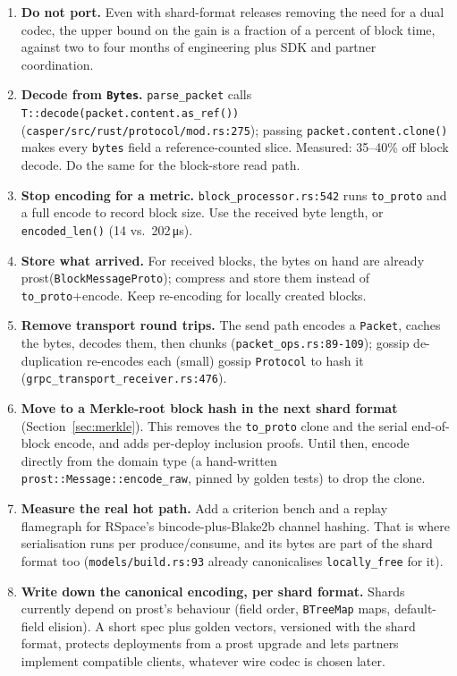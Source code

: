 \documentclass[10pt,a4paper]{article}
\newcommand{\f}[1]{\nolinkurl{#1}}
\begin{document}
\begin{enumerate}
  \item \textbf{Do not port.} Even with shard-format releases removing the need for a dual codec,
        the upper bound on the gain is a fraction of a percent of block time, against two to four
        months of engineering plus SDK and partner coordination.
  \item \textbf{Decode from \f{Bytes}.} \f{parse_packet} calls \f{T::decode(packet.content.as_ref())}
        (\f{casper/src/rust/protocol/mod.rs:275}); passing \f{packet.content.clone()} makes every
        \f{bytes} field a reference-counted slice. Measured: 35--40\% off block decode. Do the same
        for the block-store read path.
  \item \textbf{Stop encoding for a metric.} \f{block_processor.rs:542} runs \f{to_proto} and a
        full encode to record block size. Use the received byte length, or
        \f{encoded_len()} (14 vs.\ 202\,\si{\micro\second}).
  \item \textbf{Store what arrived.} For received blocks, the bytes on hand are already
        prost(\f{BlockMessageProto}); compress and store them instead of \f{to_proto}+encode. Keep
        re-encoding for locally created blocks.
  \item \textbf{Remove transport round trips.} The send path encodes a \f{Packet}, caches the
        bytes, decodes them, then chunks (\f{packet_ops.rs:89-109}); gossip de-duplication
        re-encodes each (small) gossip \f{Protocol} to hash it (\f{grpc_transport_receiver.rs:476}).
  \item \textbf{Move to a Merkle-root block hash in the next shard format}
        (Section~\ref{sec:merkle}). This removes the \f{to_proto} clone and the serial
        end-of-block encode, and adds per-deploy inclusion proofs. Until then, encode
        directly from the domain type (a hand-written \f{prost::Message::encode_raw}, pinned by
        golden tests) to drop the clone.
  \item \textbf{Measure the real hot path.} Add a criterion bench and a replay flamegraph for
        RSpace's bincode-plus-Blake2b channel hashing. That is where serialisation runs per
        produce/consume, and its bytes are part of the shard format too (\f{models/build.rs:93} already
        canonicalises \f{locally_free} for it).
  \item \textbf{Write down the canonical encoding, per shard format.} Shards currently depend on
        prost's behaviour (field order, \f{BTreeMap} maps, default-field elision). A short spec plus golden
        vectors, versioned with the shard format, protects deployments from a prost upgrade and
        lets partners implement compatible clients, whatever wire codec is chosen later.
\end{enumerate}
\end{document}
